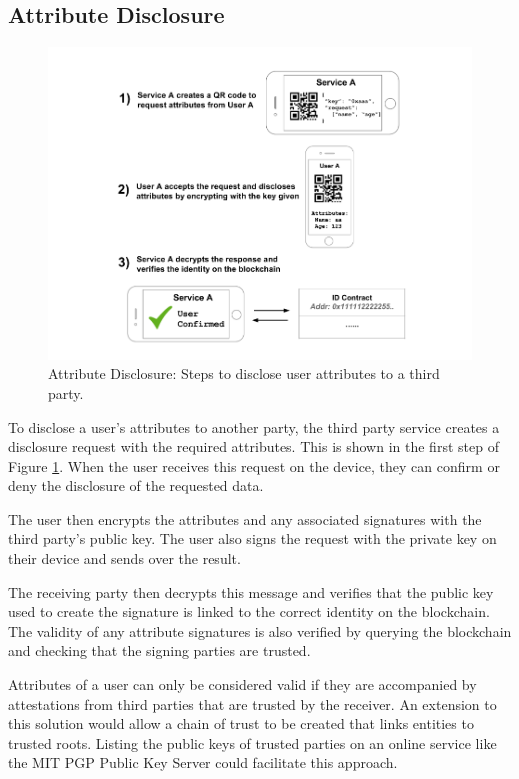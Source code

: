 \subsection{Attribute Disclosure}
\label{sec:attribute-disclosure}
\begin{figure}[ht]
\centering
     \includegraphics[width=1.0\textwidth]{./images/DiagramDisclosure.png}
      \caption{Attribute Disclosure: Steps to disclose user attributes to a third party.}
       \label{fig:diagram-disclosure}
\end{figure}
To disclose a user's attributes to another party, the third party service creates a disclosure request with the required attributes. This is shown in the first step of Figure \ref{fig:diagram-disclosure}. When the user receives this request on the device, they can confirm or deny the disclosure of the requested data.

The user then encrypts the attributes and any associated signatures with the third party's public key. The user also signs the request with the private key on their device and sends over the result.

The receiving party then decrypts this message and verifies that the public key used to create the signature is linked to the correct identity on the blockchain. The validity of any attribute signatures is also verified by querying the blockchain and checking that the signing parties are trusted.

Attributes of a user can only be considered valid if they are accompanied by attestations from third parties that are trusted by the receiver. An extension to this solution would allow a chain of trust to be created that links entities to trusted roots. Listing the public keys of trusted parties on an online service like the MIT PGP Public Key Server \cite{massachusetts_institute_of_technology_mit_nodate} could facilitate this approach.

